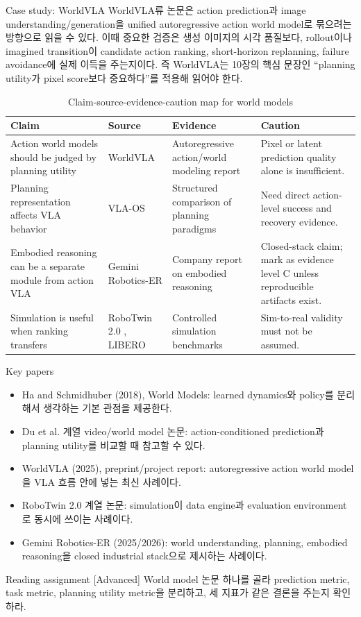 \begin{casebox}{Case study: WorldVLA}
WorldVLA류 논문은 action prediction과 image understanding/generation을 unified autoregressive action world model로 묶으려는 방향으로 읽을 수 있다. 이때 중요한 검증은 생성 이미지의 시각 품질보다, rollout이나 imagined transition이 candidate action ranking, short-horizon replanning, failure avoidance에 실제 이득을 주는지이다. 즉 WorldVLA는 10장의 핵심 문장인 ``planning utility가 pixel score보다 중요하다''를 적용해 읽어야 한다.
\end{casebox}

\begin{table}[t]
  \centering
  \small
  \caption{Claim-source-evidence-caution map for world models}
  \label{tab:ch10_claim_source}
  \begin{tabularx}{\textwidth}{L{31mm}L{30mm}L{46mm}Y}
    \toprule
    Claim & Source & Evidence & Caution \\
    \midrule
    Action world models should be judged by planning utility & WorldVLA \citep{worldvla} & Autoregressive action/world modeling report & Pixel or latent prediction quality alone is insufficient. \\
    Planning representation affects VLA behavior & VLA-OS \citep{vlaos} & Structured comparison of planning paradigms & Need direct action-level success and recovery evidence. \\
    Embodied reasoning can be a separate module from action VLA & Gemini Robotics-ER \citep{geminiroboticser} & Company report on embodied reasoning & Closed-stack claim; mark as evidence level C unless reproducible artifacts exist. \\
    Simulation is useful when ranking transfers & RoboTwin 2.0 \citep{robotwin2}, LIBERO \citep{libero} & Controlled simulation benchmarks & Sim-to-real validity must not be assumed. \\
    \bottomrule
  \end{tabularx}
\end{table}

\begin{sourcebox}{Key papers}
\begin{itemize}
  \item Ha and Schmidhuber (2018), World Models: learned dynamics와 policy를 분리해서 생각하는 기본 관점을 제공한다.
  \item Du et al. 계열 video/world model 논문: action-conditioned prediction과 planning utility를 비교할 때 참고할 수 있다.
  \item WorldVLA (2025), preprint/project report: autoregressive action world model을 VLA 흐름 안에 넣는 최신 사례이다.
  \item RoboTwin 2.0 계열 논문: simulation이 data engine과 evaluation environment로 동시에 쓰이는 사례이다.
  \item Gemini Robotics-ER (2025/2026): world understanding, planning, embodied reasoning을 closed industrial stack으로 제시하는 사례이다.
\end{itemize}
\end{sourcebox}

\begin{assignmentbox}{Reading assignment [Advanced]}
World model 논문 하나를 골라 prediction metric, task metric, planning utility metric을 분리하고, 세 지표가 같은 결론을 주는지 확인하라.
\end{assignmentbox}
